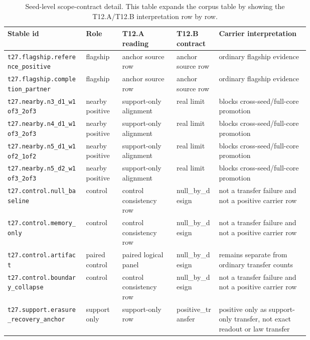 \documentclass[11pt]{article}
\theoremstyle{definition}
\begin{document}
\begin{table}[p]
\centering
\scriptsize
\caption{Seed-level scope-contract detail. This table expands the corpus table by showing
the T12.A/T12.B interpretation row by row.}
\label{tab:appendix-seed-scope-contract-detail}
\begin{tabularx}{\linewidth}{@{}>{\raggedright\arraybackslash}p{0.26\linewidth}>{\raggedright\arraybackslash}p{0.12\linewidth}>{\raggedright\arraybackslash}p{0.18\linewidth}>{\raggedright\arraybackslash}p{0.14\linewidth}>{\raggedright\arraybackslash}X@{}}
\toprule
Stable id & Role & T12.A reading & T12.B contract & Carrier interpretation \\
\midrule
\nolinkurl{t27.flagship.reference_positive} & flagship & anchor source row & anchor source row & ordinary flagship evidence \\
\nolinkurl{t27.flagship.completion_partner} & flagship & anchor source row & anchor source row & ordinary flagship evidence \\
\nolinkurl{t27.nearby.n3_d1_w1of3_2of3} & nearby positive & support-only alignment & real limit & blocks cross-seed/full-core promotion \\
\nolinkurl{t27.nearby.n4_d1_w1of3_2of3} & nearby positive & support-only alignment & real limit & blocks cross-seed/full-core promotion \\
\nolinkurl{t27.nearby.n5_d1_w1of2_1of2} & nearby positive & support-only alignment & real limit & blocks cross-seed/full-core promotion \\
\nolinkurl{t27.nearby.n5_d2_w1of3_2of3} & nearby positive & support-only alignment & real limit & blocks cross-seed/full-core promotion \\
\nolinkurl{t27.control.null_baseline} & control & control consistency row & null\_by\_design & not a transfer failure and not a positive carrier row \\
\nolinkurl{t27.control.memory_only} & control & control consistency row & null\_by\_design & not a transfer failure and not a positive carrier row \\
\nolinkurl{t27.control.artifact} & paired control & paired logical panel & null\_by\_design & remains separate from ordinary transfer counts \\
\nolinkurl{t27.control.boundary_collapse} & control & control consistency row & null\_by\_design & not a transfer failure and not a positive carrier row \\
\nolinkurl{t27.support.erasure_recovery_anchor} & support only & support-only row & positive\_transfer & positive only as support-only transfer, not exact readout or law transfer \\
\bottomrule
\end{tabularx}
\end{table}
\end{document}
